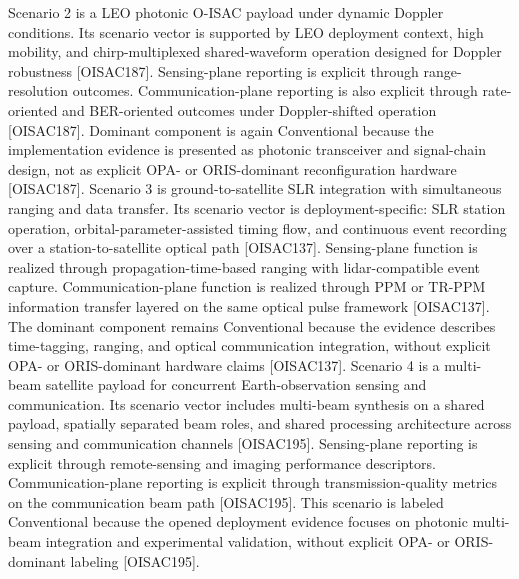 {}Scenario 2 is a LEO photonic O-ISAC payload under dynamic Doppler conditions. Its scenario vector is supported by LEO deployment context, high mobility, and chirp-multiplexed shared-waveform operation designed for Doppler robustness [O\markdownRendererUnderscore{}ISAC\markdownRendererUnderscore{}187]. Sensing-plane reporting is explicit through range-resolution outcomes. Communication-plane reporting is also explicit through rate-oriented and BER-oriented outcomes under Doppler-shifted operation [O\markdownRendererUnderscore{}ISAC\markdownRendererUnderscore{}187]. Dominant component is again Conventional because the implementation evidence is presented as photonic transceiver and signal-chain design, not as explicit OPA- or ORIS-dominant reconfiguration hardware [O\markdownRendererUnderscore{}ISAC\markdownRendererUnderscore{}187].\markdownRendererInterblockSeparator
{}
\markdownRendererSectionEnd \markdownRendererSectionBegin
{}\markdownRendererInterblockSeparator
{}Scenario 3 is ground-to-satellite SLR integration with simultaneous ranging and data transfer. Its scenario vector is deployment-specific: SLR station operation, orbital-parameter-assisted timing flow, and continuous event recording over a station-to-satellite optical path [O\markdownRendererUnderscore{}ISAC\markdownRendererUnderscore{}137]. Sensing-plane function is realized through propagation-time-based ranging with lidar-compatible event capture. Communication-plane function is realized through PPM or TR-PPM information transfer layered on the same optical pulse framework [O\markdownRendererUnderscore{}ISAC\markdownRendererUnderscore{}137]. The dominant component remains Conventional because the evidence describes time-tagging, ranging, and optical communication integration, without explicit OPA- or ORIS-dominant hardware claims [O\markdownRendererUnderscore{}ISAC\markdownRendererUnderscore{}137].\markdownRendererParagraphSeparator
{}Scenario 4 is a multi-beam satellite payload for concurrent Earth-observation sensing and communication. Its scenario vector includes multi-beam synthesis on a shared payload, spatially separated beam roles, and shared processing architecture across sensing and communication channels [O\markdownRendererUnderscore{}ISAC\markdownRendererUnderscore{}195]. Sensing-plane reporting is explicit through remote-sensing and imaging performance descriptors. Communication-plane reporting is explicit through transmission-quality metrics on the communication beam path [O\markdownRendererUnderscore{}ISAC\markdownRendererUnderscore{}195]. This scenario is labeled Conventional because the opened deployment evidence focuses on photonic multi-beam integration and experimental validation, without explicit OPA- or ORIS-dominant labeling [O\markdownRendererUnderscore{}ISAC\markdownRendererUnderscore{}195].\markdownRendererInterblockSeparator
